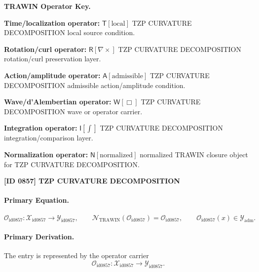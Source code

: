 \par\vspace{0.45\baselineskip}
\noindent\begin{minipage}[t]{\linewidth}
\begingroup
\small
\raggedright
\textbf{TRAWIN Operator Key.}\par
\noindent\textbf{Time/localization operator:} $\mathsf{T}\!\left[\mathrm{local}\right]$ TZP CURVATURE DECOMPOSITION local source condition.\par
\noindent\textbf{Rotation/curl operator:} $\mathsf{R}\!\left[\nabla\times\right]$ TZP CURVATURE DECOMPOSITION rotation/curl preservation layer.\par
\noindent\textbf{Action/amplitude operator:} $\mathsf{A}\!\left[\mathrm{admissible}\right]$ TZP CURVATURE DECOMPOSITION admissible action/amplitude condition.\par
\noindent\textbf{Wave/d'Alembertian operator:} $\mathsf{W}\!\left[\Box\right]$ TZP CURVATURE DECOMPOSITION wave or operator carrier.\par
\noindent\textbf{Integration operator:} $\mathsf{I}\!\left[\int\right]$ TZP CURVATURE DECOMPOSITION integration/comparison layer.\par
\noindent\textbf{Normalization operator:} $\mathsf{N}\!\left[\mathrm{normalized}\right]$ normalized TRAWIN closure object for TZP CURVATURE DECOMPOSITION.\par
\endgroup
\end{minipage}

\clearpage
\noindent\textbf{[ID 0857] TZP CURVATURE DECOMPOSITION}\par
\vspace{0.35em}
\paragraph{Primary Equation.}
\[
\mathcal{O}_{\mathrm{id0857}}:\mathcal{X}_{\mathrm{id0857}}\longrightarrow \mathcal{Y}_{\mathrm{id0857}},\qquad
\mathcal{N}_{\mathrm{TRAWIN}}(\mathcal{O}_{\mathrm{id0857}})=\mathcal{O}_{\mathrm{id0857}},\qquad
\mathcal{O}_{\mathrm{id0857}}(x)\in\mathcal{Y}_{\mathrm{adm}}.
\]

\paragraph{Primary Derivation.} The entry is represented by the operator carrier\[
\mathcal{O}_{\mathrm{id0857}}:\mathcal{X}_{\mathrm{id0857}}\longrightarrow \mathcal{Y}_{\mathrm{id0857}}.
\]

